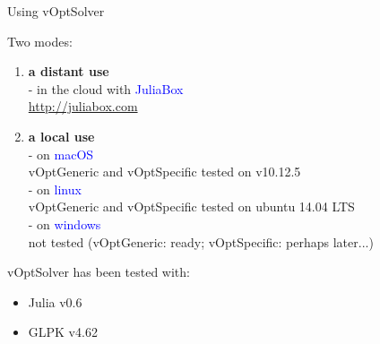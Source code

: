 \documentclass[10pt,xcolor=dvipsnames]{beamer}
\newcommand{\blue}{\textcolor{blue}}
\begin{document}
%
% 
\begin{frame}{Using vOptSolver}


Two modes:\\ 
\begin{enumerate}
\item \textbf{a distant use} \\
     \quad - in the cloud with \blue{JuliaBox}\\
     \qquad \url{http://juliabox.com}

\medskip
\item \textbf{a local use}   \\
    \quad - on \blue{macOS}\\ \qquad vOptGeneric and vOptSpecific  tested on v10.12.5 \\
    \quad  - on \blue{linux}\\ \qquad vOptGeneric and vOptSpecific tested on ubuntu 14.04 LTS\\
    \quad  - on \blue{windows}\\ \qquad not tested (vOptGeneric: ready; vOptSpecific: perhaps later...)
\end{enumerate}
\bigskip

vOptSolver has been tested with:
\begin{itemize}
\item Julia v0.6
\item GLPK v4.62
\end{itemize}


\end{frame}
\end{document}
